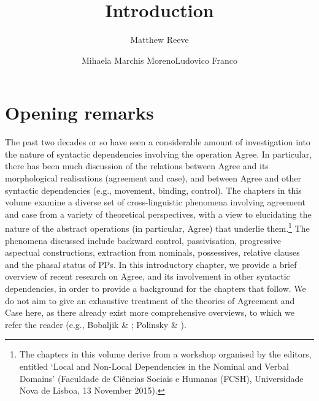 \documentclass[output=paper]{langsci/langscibook}
\author{Matthew Reeve\affiliation{Zhejiang University}\and Mihaela Marchis Moreno\affiliation{FCSH, Universidade Nova de Lisboa}\lastand Ludovico Franco\affiliation{FCSH, Universidade Nova de Lisboa}}
\title{Introduction}
\begin{document}
\section{Opening remarks}

The past two decades or so have seen a considerable amount of investigation into the nature of syntactic dependencies involving the operation Agree. In particular, there has been much discussion of the relations between Agree and its morphological realisations (agreement and case), and between Agree and other syntactic dependencies (e.g., movement, binding, control). The chapters in this volume examine a diverse set of cross-linguistic phenomena involving agreement and case from a variety of theoretical perspectives, with a view to elucidating the nature of the abstract operations (in particular, Agree) that underlie them.\footnote{The chapters in this volume derive from a workshop organised by the editors, entitled ‘Local and Non-Local Dependencies in the Nominal and Verbal Domains’ (Faculdade de Ciências Sociais e Humanas (FCSH), Universidade Nova de Lisboa, 13 November 2015).} The phenomena discussed include backward control, passivisation, progressive aspectual constructions, extraction from nominals, possessives, relative clauses and the phasal status of PPs. In this introductory chapter, we provide a brief overview of recent research on Agree, and its involvement in other syntactic dependencies, in order to provide a background for the chapters that follow. We do not aim to give an exhaustive treatment of the theories of Agreement and Case here, as there already exist more comprehensive overviews, to which we refer the reader (e.g., Bobaljik \& \citealt{Wurmbrand2008}; Polinsky \& \citealt{Preminger2014}).
\end{document}
